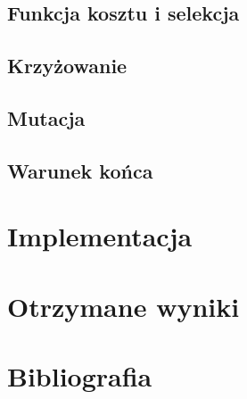 \documentclass{article}
\begin{document}
\subsection{Funkcja kosztu i selekcja}

\subsection{Krzyżowanie}

\subsection{Mutacja}

\subsection{Warunek końca}


\section{Implementacja}



\section{Otrzymane wyniki}

\section{Bibliografia}

\printbibliography
\end{document}
